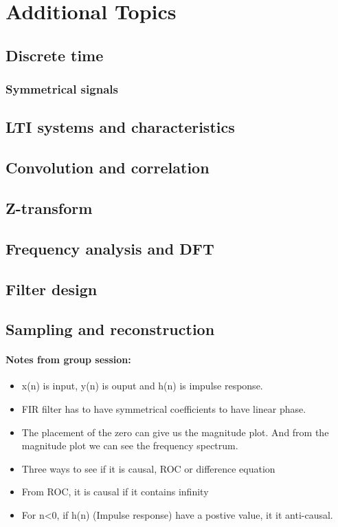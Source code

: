 \documentclass{article}
\begin{document}
\section{Additional Topics}
\subsection{Discrete time}
\subsubsection{Symmetrical signals}

\subsection{LTI systems and characteristics}

\subsection{Convolution and correlation}

\subsection{Z-transform}

\subsection{Frequency analysis and DFT}

\subsection{Filter design}

\subsection{Sampling and reconstruction}

\paragraph{Notes from group session:}
\begin{itemize}
    \item x(n) is input, y(n) is ouput and h(n) is impulse response. 
    \item FIR filter has to have symmetrical coefficients to have linear phase.
    \item The placement of the zero can give us the magnitude plot. And from the magnitude plot we can see the frequency spectrum. 
    \item Three ways to see if it is causal, ROC or difference equation
    \item From ROC, it is causal if it contains infinity
    \item For n<0, if h(n) (Impulse response) have a postive value, it it anti-causal.
\end{itemize}
\end{document}

